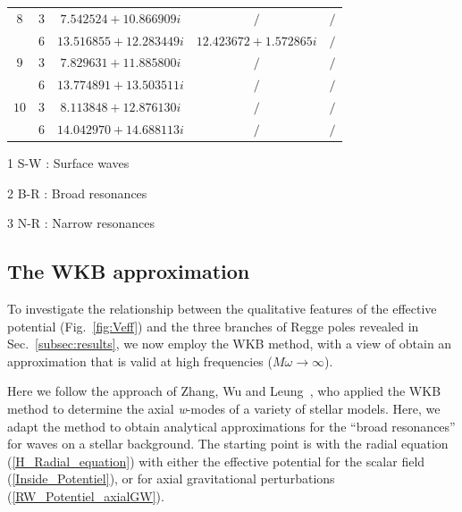 \documentclass[aps,prd,longbibliography,reprint,twocolumn,amsmath,amssymb,amsfonts,showpacs,superscriptaddress]{revtex4-1}%
\begin{document}
\begin{table}[htp]
\begin{threeparttable}[htp]
\begin{ruledtabular}
\begin{tabular}{ccccc}
$8$  & $3$  & $7.542524+10.866909 i $  & $ /$  & $/ $   \\
     & $6$  & $13.516855+12.283449 i $  & $12.423672+1.572865 i $  & $/ $   \\

$9$  & $3$  & $7.829631+11.885800 i   $  & $/ $  & $/ $   \\
     & $6$  & $13.774891+13.503511 i  $  & $/ $  & $/ $   \\

$10$ & $3$  & $8.113848+12.876130 i $  & $/ $  & $/ $    \\
     & $6$  & $14.042970+14.688113 i $  & $ /$  & $/ $   \\
\end{tabular}
\end{ruledtabular}
\begin{tablenotes}
     \item[1] S-W : Surface waves
     \item[2] B-R : Broad resonances
     \item[3] N-R : Narrow  resonances
   \end{tablenotes}
\end{threeparttable}
\end{table}
\endgroup





 \subsection{The WKB approximation}
To investigate the relationship between the qualitative features of the effective potential (Fig.~\ref{fig:Veff}) and the three branches of Regge poles revealed in Sec.~\ref{subsec:results}, we now employ the WKB method, with a view of obtain an approximation that is valid at high frequencies ($M\omega \rightarrow \infty$).

Here we follow the approach of Zhang, Wu and Leung~\cite{Zhang:2011pq}, who applied the WKB method to determine the axial \textit{w}-modes of a variety of stellar models. Here, we adapt the method to obtain analytical approximations for the ``broad resonances'' for waves on a stellar background. The starting point is with the radial equation (\ref{H_Radial_equation}) with either the effective potential for the scalar field (\ref{Inside_Potentiel}), or for axial gravitational perturbations (\ref{RW_Potentiel_axialGW}). 
 
\end{document}
